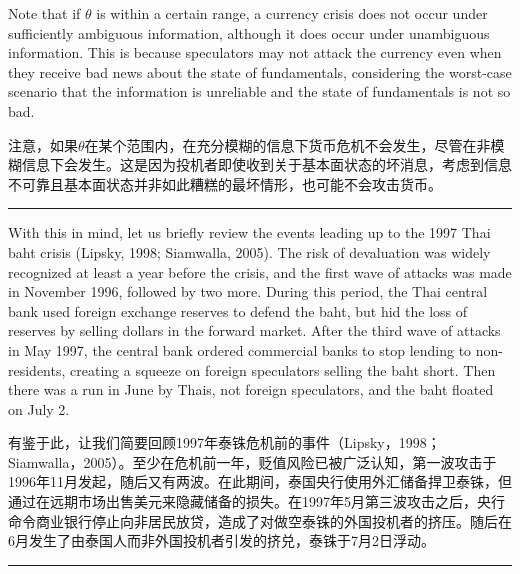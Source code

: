 \documentclass[12pt,a4paper]{article}
\newenvironment{original}
  {\par\medskip\noindent\color{black}\ignorespaces}
  {\par\medskip}
\newenvironment{translation}
  {\par\noindent\color{darkblue}\ignorespaces}
  {\par\medskip\noindent\hrule\par\medskip}
\theoremstyle{definition}
\theoremstyle{remark}
\begin{document}
\begin{original}
Note that if $\theta$ is within a certain range, a currency crisis does not occur under sufficiently ambiguous information, although it does occur under unambiguous information. This is because speculators may not attack the currency even when they receive bad news about the state of fundamentals, considering the worst-case scenario that the information is unreliable and the state of fundamentals is not so bad.
\end{original}
\begin{translation}
注意，如果$\theta$在某个范围内，在充分模糊的信息下货币危机不会发生，尽管在非模糊信息下会发生。这是因为投机者即使收到关于基本面状态的坏消息，考虑到信息不可靠且基本面状态并非如此糟糕的最坏情形，也可能不会攻击货币。
\end{translation}
\begin{original}
With this in mind, let us briefly review the events leading up to the 1997 Thai baht crisis (Lipsky, 1998; Siamwalla, 2005). The risk of devaluation was widely recognized at least a year before the crisis, and the first wave of attacks was made in November 1996, followed by two more. During this period, the Thai central bank used foreign exchange reserves to defend the baht, but hid the loss of reserves by selling dollars in the forward market. After the third wave of attacks in May 1997, the central bank ordered commercial banks to stop lending to non-residents, creating a squeeze on foreign speculators selling the baht short. Then there was a run in June by Thais, not foreign speculators, and the baht floated on July 2.
\end{original}
\begin{translation}
有鉴于此，让我们简要回顾1997年泰铢危机前的事件（Lipsky，1998；Siamwalla，2005）。至少在危机前一年，贬值风险已被广泛认知，第一波攻击于1996年11月发起，随后又有两波。在此期间，泰国央行使用外汇储备捍卫泰铢，但通过在远期市场出售美元来隐藏储备的损失。在1997年5月第三波攻击之后，央行命令商业银行停止向非居民放贷，造成了对做空泰铢的外国投机者的挤压。随后在6月发生了由泰国人而非外国投机者引发的挤兑，泰铢于7月2日浮动。
\end{translation}
\end{document}
